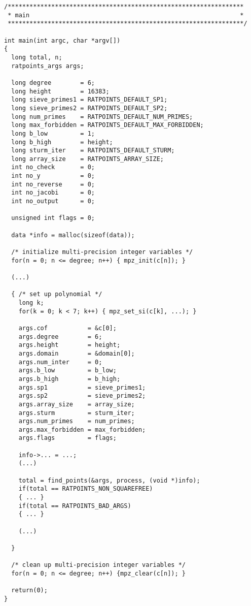 \documentclass[12pt,a4paper,oneside]{amsart}
\begin{document}
\begin{verbatim}
/*****************************************************************
 * main                                                          *
 *****************************************************************/

int main(int argc, char *argv[])
{
  long total, n;
  ratpoints_args args;

  long degree        = 6;
  long height        = 16383;
  long sieve_primes1 = RATPOINTS_DEFAULT_SP1;
  long sieve_primes2 = RATPOINTS_DEFAULT_SP2;
  long num_primes    = RATPOINTS_DEFAULT_NUM_PRIMES;
  long max_forbidden = RATPOINTS_DEFAULT_MAX_FORBIDDEN;
  long b_low         = 1;
  long b_high        = height;
  long sturm_iter    = RATPOINTS_DEFAULT_STURM;
  long array_size    = RATPOINTS_ARRAY_SIZE;
  int no_check       = 0;
  int no_y           = 0;
  int no_reverse     = 0;
  int no_jacobi      = 0;
  int no_output      = 0;

  unsigned int flags = 0;

  data *info = malloc(sizeof(data));

  /* initialize multi-precision integer variables */
  for(n = 0; n <= degree; n++) { mpz_init(c[n]); }

  (...)

  { /* set up polynomial */
    long k;
    for(k = 0; k < 7; k++) { mpz_set_si(c[k], ...); }

    args.cof           = &c[0];
    args.degree        = 6;
    args.height        = height;
    args.domain        = &domain[0];
    args.num_inter     = 0;
    args.b_low         = b_low;
    args.b_high        = b_high;
    args.sp1           = sieve_primes1;
    args.sp2           = sieve_primes2;
    args.array_size    = array_size;
    args.sturm         = sturm_iter;
    args.num_primes    = num_primes;
    args.max_forbidden = max_forbidden;
    args.flags         = flags;

    info->... = ...;
    (...)

    total = find_points(&args, process, (void *)info);
    if(total == RATPOINTS_NON_SQUAREFREE)
    { ... }
    if(total == RATPOINTS_BAD_ARGS)
    { ... }

    (...)

  }

  /* clean up multi-precision integer variables */
  for(n = 0; n <= degree; n++) {mpz_clear(c[n]); }

  return(0);
}
\end{verbatim}
\end{document}
